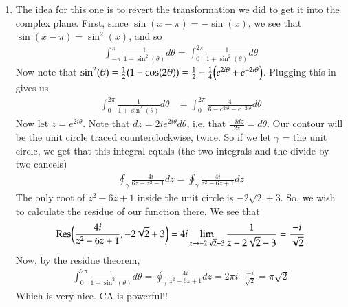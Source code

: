 \documentclass[12pt]{article}
\theoremstyle{definition}
\theoremstyle{remark}
\begin{document}
\begin{enumerate}[leftmargin=\labelsep]
		\item The idea for this one is to revert the transformation we did to get it into the complex plane. First, since $\sin(x-\pi) = -\sin(x)$, we see that $\sin(x-\pi) = \sin^2(x)$, and so 
		\begin{align*}
			\int_{-\pi}^{\pi} \frac{1}{1+\sin^2(\theta)}d\theta = \int_0^{2\pi} \frac{1}{1+\sin^2(\theta)}d\theta
		\end{align*}
		Now note that $\sin^2(\theta) = \frac12 (1 - \cos(2\theta)) = \frac12 - \frac14 \qty(e^{2i\theta}+e^{-2i\theta})$. Plugging this in gives us
		\begin{align*}
			\int_0^{2\pi} \frac{1}{1+\sin^2(\theta)}d\theta &= \int_0^{2\pi} \frac{4}{6-e^{2i\theta}-e^{-2i\theta}}d\theta
		\end{align*}
		Now let $z = e^{2i\theta}$. Note that $dz = 2ie^{2i\theta}d\theta$, i.e. that $\frac{-idz}{2z} = d\theta$. Our contour will be the unit circle traced counterclockwise, twice. So if we let $\gamma$ = the unit circle, we get that this integral equals (the two integrals and the divide by two cancels)
		\begin{align*}
			\oint_\gamma \frac{-4i}{6z-z^2-1}dz = \oint_\gamma \frac{4i}{z^2-6z+1}dz
		\end{align*}
		The only root of $z^2-6z+1$ inside the unit circle is $-2\sqrt{2}+3$. So, we wish to calculate the residue of our function there. We see that
		\begin{align*}
			\Res(\frac{4i}{z^2-6z+1}, -2\sqrt{2}+3) = 4i \lim_{z \to -2\sqrt{2}+3} \frac{1}{z-2\sqrt{2}-3} = \frac{-i}{\sqrt{2}}
		\end{align*}
		Now, by the residue theorem,
		\begin{align*}
			\int_0^{2\pi} \frac1{1+\sin^2(\theta)}d\theta = \oint_\gamma \frac{4i}{z^2-6z+1}dz = 2\pi i \cdot \frac{-i}{\sqrt{2}} = \pi\sqrt{2}
		\end{align*}
		Which is very nice. CA is powerful!!
		

\end{enumerate}
\end{document}
